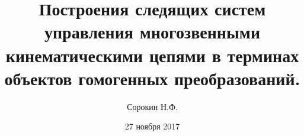 \documentclass[12pt,a4paper,titlepage]{article}
\begin{document}
\date{27 ноября 2017}

\title{Построения следящих систем управления многозвенными кинематическими цепями в терминах объектов гомогенных преобразований.}
\author{Сорокин Н.Ф.}

\maketitle


























\end{document}
